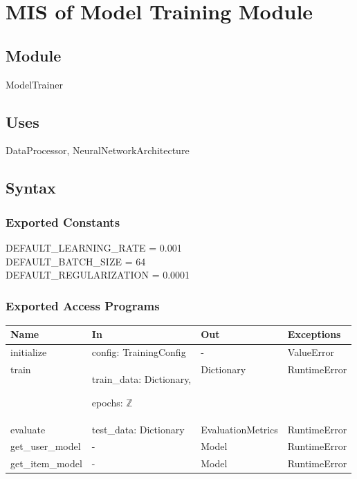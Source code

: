 \documentclass[12pt, titlepage]{article}
\begin{document}
\newpage

\section{MIS of Model Training Module} \label{ModuleMT}

\subsection{Module}

ModelTrainer

\subsection{Uses}
DataProcessor, NeuralNetworkArchitecture

\subsection{Syntax}

\subsubsection{Exported Constants}
DEFAULT\_LEARNING\_RATE = 0.001\\
DEFAULT\_BATCH\_SIZE = 64\\
DEFAULT\_REGULARIZATION = 0.0001
\subsubsection{Exported Access Programs}

\begin{center}
  \begin{tabular}{p{3cm} p{5cm} p{4cm} p{2cm}}
  \hline
  \textbf{Name} & \textbf{In} & \textbf{Out} & \textbf{Exceptions} \\
  \hline
  initialize & config: TrainingConfig & - & ValueError \\
  \hline
  train & train\_data: Dictionary,
  
  epochs: $\mathbb{Z}$
  
  & Dictionary & RuntimeError \\
  \hline
  evaluate & test\_data: Dictionary
  
  & EvaluationMetrics & RuntimeError \\
  \hline
  get\_user\_model & 
  
  - &  Model & RuntimeError \\
  \hline
  get\_item\_model & 
  
  - &  Model & RuntimeError \\
  \hline
  \end{tabular}
  \end{center}
\end{document}
